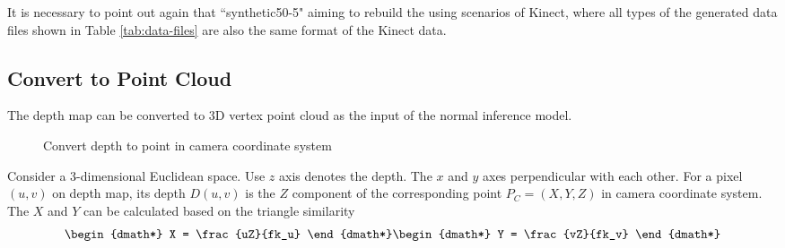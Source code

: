 It is necessary to point out again that ``synthetic50-5" aiming to rebuild the using scenarios of Kinect, where all types of the generated data files shown in Table \ref{tab:data-files} are also the same format of the Kinect data.



\subsection{Convert to Point Cloud}
\label{sec:depth-map-to-point-cloud}
The depth map can be converted to 3D vertex point cloud as the input of the normal inference model. 

\begin{figure}[h!]
	\centering
	\caption{Convert depth to point in camera coordinate system}
	\label{fig:depth-triangulation}
\end{figure}

Consider a 3-dimensional Euclidean space. Use $ z $ axis denotes the depth. The $ x  $ and $ y $ axes perpendicular with each other. For a pixel $ (u,v) $ on depth map, its depth $ D(u,v) $ is the $ Z $ component of the corresponding point $P_C = (X,Y,Z) $ in camera coordinate system. The $ X $ and $ Y $ can be calculated based on the triangle similarity
\begin{dgroup*}
	
	\begin{dmath*}
		X = \frac{uZ}{fk_u}
	\end{dmath*}
	\begin{dmath*}
		Y = \frac{vZ}{fk_v}
	\end{dmath*}
\end{dgroup*}

